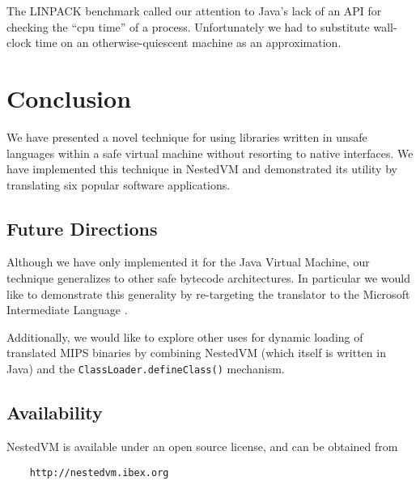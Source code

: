 \documentclass{acmconf}
\begin{document}
The LINPACK benchmark called our attention to Java's lack of an API
for checking the ``cpu time'' of a process.  Unfortunately we had to
substitute wall-clock time on an otherwise-quiescent machine as an
approximation.




\section{Conclusion}

We have presented a novel technique for using libraries written in
unsafe languages within a safe virtual machine without resorting to
native interfaces.  We have implemented this technique in NestedVM and
demonstrated its utility by translating six popular software
applications.

\subsection{Future Directions}

Although we have only implemented it for the Java Virtual Machine, our
technique generalizes to other safe bytecode architectures.  In
particular we would like to demonstrate this generality by re-targeting
the translator to the Microsoft Intermediate Language \cite{msil}.

Additionally, we would like to explore other uses for dynamic loading
of translated MIPS binaries by combining NestedVM (which itself is
written in Java) and the {\tt ClassLoader.defineClass()} mechanism.

\subsection{Availability}

NestedVM is available under an open source license, and can be
obtained from
\begin{verbatim}
    http://nestedvm.ibex.org
\end{verbatim}



\end{document}
